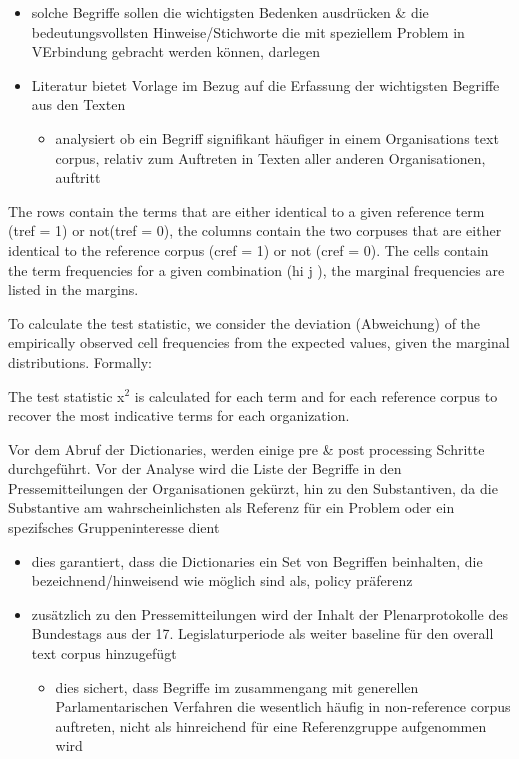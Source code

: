 \documentclass[11pt]{article}
\begin{document}
\begin{enumerate}
\begin{itemize}
\item solche Begriffe sollen die wichtigsten Bedenken ausdrücken \& die bedeutungsvollsten Hinweise/Stichworte die mit speziellem Problem in VErbindung gebracht werden können, darlegen
\item Literatur bietet Vorlage im Bezug auf die Erfassung der wichtigsten Begriffe aus den Texten 
\begin{itemize}
\item analysiert ob ein Begriff signifikant häufiger in einem Organisations text corpus, relativ zum Auftreten in Texten aller anderen Organisationen, auftritt
\end{itemize}
\end{itemize}

The rows contain the terms that are either identical to a given reference term (tref = 1) or not(tref = 0), the columns contain the two corpuses that are either identical to the reference corpus (cref = 1) or not (cref = 0). The cells contain the term frequencies for a given combination (hi j ), the marginal frequencies are listed in the margins.

To calculate the test statistic, we consider the deviation (Abweichung) of the empirically observed cell frequencies from the expected values, given the marginal distributions. Formally:

The test statistic x\(^{\text{2}}\) is calculated for each term and for each reference corpus to recover the most indicative terms for each organization.

Vor dem Abruf der Dictionaries, werden einige pre \& post processing Schritte durchgeführt. Vor der Analyse wird die Liste der Begriffe in den Pressemitteilungen der Organisationen gekürzt, hin zu den Substantiven, da die Substantive am wahrscheinlichsten als Referenz für ein Problem oder ein spezifsches Gruppeninteresse dient 

\begin{itemize}
\item dies garantiert, dass die Dictionaries ein Set von Begriffen beinhalten, die bezeichnend/hinweisend wie möglich sind als, policy präferenz
\item zusätzlich zu den Pressemitteilungen wird der Inhalt der Plenarprotokolle des Bundestags aus der 17. Legislaturperiode als weiter baseline für den overall text corpus hinzugefügt
\begin{itemize}
\item dies sichert, dass Begriffe im zusammengang mit generellen Parlamentarischen Verfahren die wesentlich häufig in non-reference corpus auftreten, nicht  als hinreichend für eine Referenzgruppe aufgenommen wird
\end{itemize}
\end{itemize}


\end{enumerate}
\end{document}
